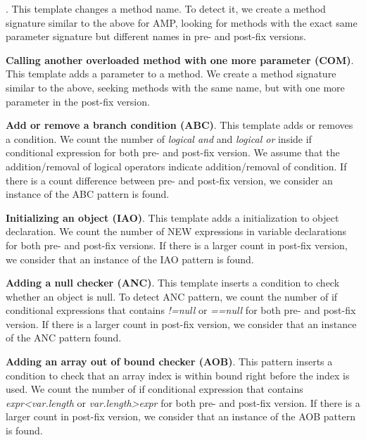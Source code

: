 \documentclass{sig-alternate-05-2015}
\begin{document}
\vspace{1ex}
.  This
template changes a method name. %
To detect it, we create a method signature similar
to the above for AMP, looking for methods
with the exact same parameter signature but different names in pre- and
post-fix versions. %

\vspace{1ex}
\noindent
{\bf Calling another overloaded method with one more parameter (COM)}. This
template adds a parameter to a method. %
We create a method signature similar to the above, seeking methods with
  the same name, but with one more parameter in the post-fix version. 

\vspace{1ex}
\noindent
 {\bf Add or remove a branch condition (ABC)}. This template adds or removes a condition.
We count the number of { \em logical and} and {\em
    logical or} inside if conditional expression for both pre- and post-fix
  version. We assume that the addition/removal of logical operators indicate
  addition/removal of condition. If there is a count difference between pre- and post-fix version,
  we consider an instance of the ABC pattern is found. 

\vspace{1ex}
\noindent
{\bf Initializing an object (IAO)}. This template adds a initialization to object
declaration.  We count the number of NEW expressions in variable declarations
for both pre- and post-fix versions. If there is a larger count in post-fix
version, we consider that an instance of the IAO pattern is found.

\vspace{1ex}
\noindent
 {\bf Adding a null checker (ANC)}.  This template inserts a condition to check whether an
    object is null.
  To detect ANC pattern, we count the number of if conditional expressions that
  contains {\em !=null} or {\em ==null} for both pre- and post-fix
  version. If there is a larger count in post-fix version,
  we consider that an instance of the ANC pattern found.

\vspace{1ex}
\noindent
 {\bf Adding an array out of bound checker (AOB)}. This pattern inserts a condition to check that an array
    index is within bound right before the index is used.
 We count the number of if conditional expression that
  contains {\em expr<var.length} or {\em var.length>expr} for both pre- and
  post-fix version. If there is a larger count in post-fix version, we consider that an instance of the AOB pattern is found.
\end{document}
